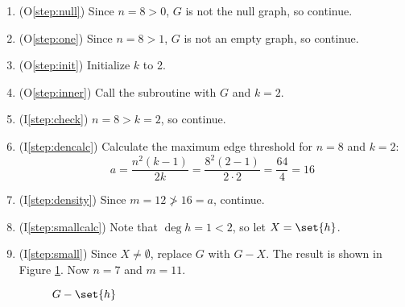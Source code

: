 \begin{enumerate}
\item (O\ref{step:null}) Since \(n=8>0\), \(G\) is not the null graph, so continue.

\item (O\ref{step:one}) Since \(n=8>1\), \(G\) is not an empty graph, so continue.

\item (O\ref{step:init}) Initialize \(k\) to 2.

\item (O\ref{step:inner}) Call the subroutine with \(G\) and \(k=2\).

\item (I\ref{step:check}) \(n=8>k=2\), so continue.

\item (I\ref{step:dencalc}) Calculate the maximum edge threshold for \(n=8\) and \(k=2\):
  \[a=\frac{n^2(k-1)}{2k}=\frac{8^2(2-1)}{2\cdot2}=\frac{64}{4}=16\]

\item (I\ref{step:density}) Since \(m=12\ngtr16=a\), continue.

\item (I\ref{step:smallcalc}) Note that \(\deg{h}=1<2\), so let \(X=\set{h}\).

\item (I\ref{step:small}) Since \(X\ne\emptyset\), replace \(G\) with \(G-X\).  The result is shown in Figure
  \ref{fig:removeh}.  Now \(n=7\) and \(m=11\).

  \begin{figure}[h]
    \label{fig:removeh}
    \begin{center}
    \end{center}
    \caption{\(G-\set{h}\)}
  \end{figure}


\end{enumerate}
